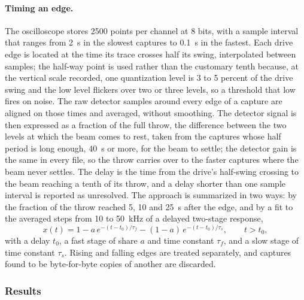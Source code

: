 \documentclass{article}
\begin{document}
\paragraph{Timing an edge.}
The oscilloscope stores 2500 points per channel at 8 bits, with a sample interval that ranges
from 2~\textmu s in the slowest captures to 0.1~\textmu s in the fastest. Each drive edge is
located at the time its trace crosses half its swing, interpolated between samples; the half-way
point is used rather than the customary tenth because, at the vertical scale recorded, one
quantization level is 3 to 5 percent of the drive swing and the low level flickers over two or
three levels, so a threshold that low fires on noise. The raw detector samples around every edge of a capture are aligned on those times and
averaged, without smoothing. The detector signal is then expressed as a fraction of the full
throw, the difference between the two levels at which the beam comes to rest, taken from the
captures whose half period is long enough, 40~\textmu s or more, for the beam to settle; the
detector gain is the same in every file, so the throw carries over to the faster captures where
the beam never settles. The delay is the time from the drive's half-swing crossing to the beam
reaching a tenth of its throw, and a delay shorter than one sample interval is reported as
unresolved. The approach is summarized in two ways: by the fraction of the throw reached 5, 10 and
25~\textmu s after the edge, and by a fit to the averaged steps from 10 to 50~kHz of a delayed
two-stage response,
\begin{equation}
    x(t) = 1 - a\,e^{-(t-t_0)/\tau_f} - (1-a)\,e^{-(t-t_0)/\tau_s}, \qquad t > t_0,
\end{equation}
with a delay $t_0$, a fast stage of share $a$ and time constant $\tau_f$, and a slow stage of time
constant $\tau_s$. Rising and falling edges are treated separately, and captures found to be
byte-for-byte copies of another are discarded.

\subsubsection{Results}
\end{document}
